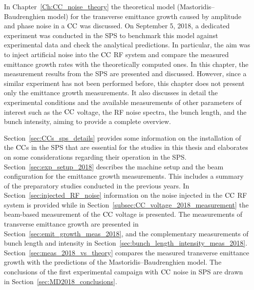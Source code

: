 \vspace*{-1mm}
In Chapter~\ref{Ch:CC_noise_theory} the theoretical model (Mastoridis--Baudrenghien model) for the transverse emittance growth caused by amplitude and phase noise in a ${\mathrm{CC}}$ was discussed. On September 5, 2018, a dedicated experiment was conducted in the SPS to benchmark this model against experimental data and check the analytical predictions. In particular, the aim was to inject artificial noise into the ${\mathrm{CC}}$ RF system and compare the measured emittance growth rates with the theoretically computed ones. In this chapter, the measurement results from the SPS are presented and discussed. However, since a similar experiment has not been performed before, this chapter does not present only the emittance growth measurements. It also discusses in detail the experimental conditions and the available measurements of other parameters of interest such as the ${\mathrm{CC}}$ voltage, the RF noise spectra, the bunch length, and the bunch intensity, aiming to provide a complete overview.


Section~\ref{sec:CCs_sps_details} provides some information on the installation of the ${\mathrm{CC}}$s in the SPS that are essential for the studies in this thesis and elaborates on some considerations regarding their operation in the SPS. Section~\ref{sec:exp_setup_2018} describes the machine setup and the beam configuration for the emittance growth measurements. This includes a summary of the preparatory studies conducted in the previous years. In Section~\ref{sec:injected_RF_noise} information on the noise injected in the ${\mathrm{CC}}$ RF system is provided while in Section~\ref{subsec:CC_voltage_2018_measurement} the beam-based measurement of the ${\mathrm{CC}}$ voltage is presented. The measurements of transverse emittance growth are presented in Section~\ref{sec:emit_growth_meas_2018}, and the complementary measurements of bunch length and intensity in Section~\ref{sec:bunch_length_intensity_meas_2018}. Section~\ref{sec:meas_2018_vs_theory} compares the measured transverse emittance growth with the predictions of the Mastoridis--Baudrenghien model. The conclusions of the first experimental campaign with ${\mathrm{CC}}$ noise in SPS are drawn in Section~\ref{sec:MD2018_conclusions}.

